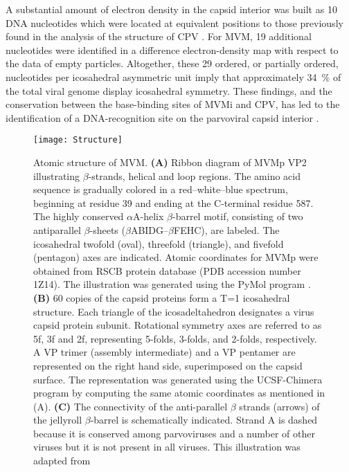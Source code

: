 A substantial amount of electron density in the capsid interior was built as 10 DNA nucleotides which were located at equivalent positions to those previously found in the analysis of the structure of CPV \cite{pmid7735832, pmid1616694}. For MVM, 19 additional nucleotides were identified in a difference electron-density map with respect to the data of empty particles. Altogether, these 29 ordered, or partially ordered, nucleotides per icosahedral asymmetric unit imply that approximately 34~\% of the total viral genome display icosahedral symmetry. These findings, and the conservation between the base-binding sites of MVMi and CPV, has led to the identification of a DNA-recognition site on the parvoviral capsid interior \cite{pmid9817841}.    

\begin{figure}
\centering
  \texttt{[image: Structure]}
  \caption[Structure of MVM]
   {Atomic structure of MVM. \textbf{(A)} Ribbon diagram of MVMp VP2 illustrating $\beta$-strands, helical and loop regions. The amino acid sequence is gradually colored in a red–white–blue spectrum, beginning at residue 39 and ending at the C-terminal residue 587. The highly conserved $\alpha$A-helix $\beta$-barrel motif, consisting of two antiparallel $\beta$-sheets ($\beta$ABIDG–$\beta$FEHC), are labeled. The icosahedral twofold (oval), threefold (triangle), and fivefold (pentagon) axes are indicated. Atomic coordinates for MVMp were obtained from RSCB protein database (PDB accession number 1Z14). The illustration was generated using the PyMol program \cite{PyMol}. \textbf{(B)} 60 copies of the capsid proteins form a T=1 icosahedral structure. Each triangle of the icosadeltahedron designates a virus capsid protein subunit. Rotational symmetry axes are referred to as 5f, 3f and 2f, representing 5-folds, 3-folds, and 2-folds, respectively. A VP trimer (assembly intermediate) and a VP pentamer are represented on the right hand side, superimposed on the capsid surface. The representation was generated using the UCSF-Chimera program \cite{pmid15264254} by computing the same atomic coordinates as mentioned in (A). \textbf{(C)} The connectivity of the anti-parallel $\beta$ strands (arrows) of the jellyroll $\beta$-barrel is schematically indicated. Strand A is dashed because it is conserved among parvoviruses and a number of other viruses but it is not present in all viruses. This illustration was adapted from \cite{Structure}} 
\label{Structure1}
\end{figure}


